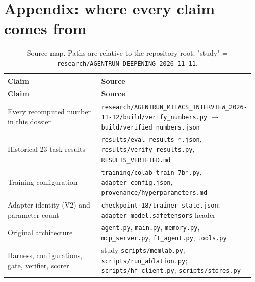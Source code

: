 \documentclass[10.5pt,a4paper,oneside]{report}
\begin{document}
\chapter*{Appendix: where every claim comes from}
\begingroup\small\setlength{\tabcolsep}{4pt}\renewcommand{\arraystretch}{1.18}
\begin{longtable}{>{\raggedright\arraybackslash}p{0.646\linewidth}>{\raggedright\arraybackslash}p{0.314\linewidth}}
\caption{Source map. Paths are relative to the repository root; "study" = \texttt{research/\allowbreak{}AGENTRUN\_\allowbreak{}DEEPENING\_\allowbreak{}2026-11-11}.}\\
\toprule
\textbf{Claim} & \textbf{Source} \\
\midrule
\endfirsthead
\toprule
\textbf{Claim} & \textbf{Source} \\
\midrule
\endhead
\bottomrule
\endlastfoot
Every recomputed number in this dossier & \texttt{research/\allowbreak{}AGENTRUN\_\allowbreak{}MITACS\_\allowbreak{}INTERVIEW\_\allowbreak{}2026-11-12/\allowbreak{}build/\allowbreak{}verify\_\allowbreak{}numbers.\allowbreak{}py} $\rightarrow$ \texttt{build/\allowbreak{}verified\_\allowbreak{}numbers.\allowbreak{}json} \\
Historical 23-task results & \texttt{results/\allowbreak{}eval\_\allowbreak{}results\_\allowbreak{}*.\allowbreak{}json}, \texttt{results/\allowbreak{}verify\_\allowbreak{}results.\allowbreak{}py}, \texttt{RESULTS\_\allowbreak{}VERIFIED.\allowbreak{}md} \\
Training configuration & \texttt{training/\allowbreak{}colab\_\allowbreak{}train\_\allowbreak{}7b*.\allowbreak{}py}, \texttt{adapter\_\allowbreak{}config.\allowbreak{}json}, \texttt{provenance/\allowbreak{}hyperparameters.\allowbreak{}md} \\
Adapter identity (V2) and parameter count & \texttt{checkpoint-18/\allowbreak{}trainer\_\allowbreak{}state.\allowbreak{}json}; \texttt{adapter\_\allowbreak{}model.\allowbreak{}safetensors} header \\
Original architecture & \texttt{agent.\allowbreak{}py}, \texttt{main.\allowbreak{}py}, \texttt{memory.\allowbreak{}py}, \texttt{mcp\_\allowbreak{}server.\allowbreak{}py}, \texttt{ft\_\allowbreak{}agent.\allowbreak{}py}, \texttt{tools.\allowbreak{}py} \\
Harness, configurations, gate, verifier, scorer & study \texttt{scripts/\allowbreak{}memlab.\allowbreak{}py}; \texttt{scripts/\allowbreak{}run\_\allowbreak{}ablation.\allowbreak{}py}; \texttt{scripts/\allowbreak{}hf\_\allowbreak{}client.\allowbreak{}py}; \texttt{scripts/\allowbreak{}stores.\allowbreak{}py} \\

\end{longtable}
\end{document}
